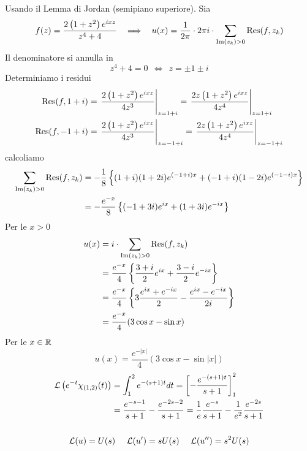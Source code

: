 Usando il Lemma di Jordan (semipiano superiore). Sia
\begin{equation*}
f(z) = \frac{2\left(1 + z^{2}\right) e^{ixz}}{z^{4} + 4} \ \ \implies \ \ u(x) = \frac{1}{2\pi} \cdot 2\pi i \cdot \sum_{\operatorname{Im} (z_{k})  > 0}\operatorname{Res} (f, z_{k})
\end{equation*}
Il denominatore si annulla in
\begin{equation*}
z^{4} + 4 = 0\ \ \iff \ \ z = \pm 1\pm i
\end{equation*}
Determiniamo i residui
\begin{align*}
\operatorname{Res} (f, 1 + i) & = \left. \frac{2\left(1 + z^{2}\right) e^{ixz}}{4z^{3}}\right|_{z = 1 + i} = \left. \frac{2z\left(1 + z^{2}\right) e^{ixz}}{4z^{4}}\right|_{z = 1 + i}\\
\operatorname{Res} (f, - 1 + i) & = \left. \frac{2\left(1 + z^{2}\right) e^{ixz}}{4z^{3}}\right|_{z = -1 + i} = \left. \frac{2z\left(1 + z^{2}\right) e^{ixz}}{4z^{4}}\right|_{z = -1 + i}
\end{align*}
calcoliamo
\begin{align*}
\sum_{\operatorname{Im} (z_{k})  > 0}\operatorname{Res} (f, z_{k}) & = - \frac{1}{8}\left\{(1 + i)(1 + 2i) e^{(- 1 + i) x} + (- 1 + i)(1 - 2i) e^{(- 1 - i) x}\right\}\\
 & = - \frac{e^{- x}}{8}\left\{(- 1 + 3i) e^{ix} + (1 + 3i) e^{- ix}\right\}
\end{align*}
Per le $x > 0$
\begin{align*}
u(x) & = i \cdot \sum_{\operatorname{Im} (z_{k})  > 0}\operatorname{Res} (f, z_{k})\\
 & = \frac{e^{- x}}{4}\left\{\frac{3 + i}{2} e^{ix} + \frac{3 - i}{2} e^{- ix}\right\}\\
 & = \frac{e^{- x}}{4}\left\{3\frac{e^{ix} + e^{- ix}}{2} - \frac{e^{ix} - e^{- ix}}{2i}\right\}\\
 & = \frac{e^{- x}}{4}(3\cos x - \sin x)
\end{align*}
Per le $x\in \mathbb{R} $
\begin{equation*}
u(x) = \frac{e^{- | x|}}{4}(3\cos x - \sin| x|)
\end{equation*}
\Soluzione
\begin{gather*}
\begin{aligned}
\mathcal{L}\left(e^{- t} \chi_{(1, 2)}(t)\right) & = \int^{2}_{1} e^{- (s + 1) t} dt = \left[ - \frac{e^{- (s + 1) t}}{s + 1}\right]^{2}_{1}\\
 & = \frac{e^{- s - 1}}{s + 1} - \frac{e^{- 2s - 2}}{s + 1} = \frac{1}{e}\frac{e^{- s}}{s + 1} - \frac{1}{e^{2}}\frac{e^{- 2s}}{s + 1}
\end{aligned}\\
\\
\mathcal{L}(u) = U(s) \ \ \ \ \mathcal{L}(u') = sU(s) \ \ \ \ \mathcal{L}(u'') = s^{2} U(s)
\end{gather*}
